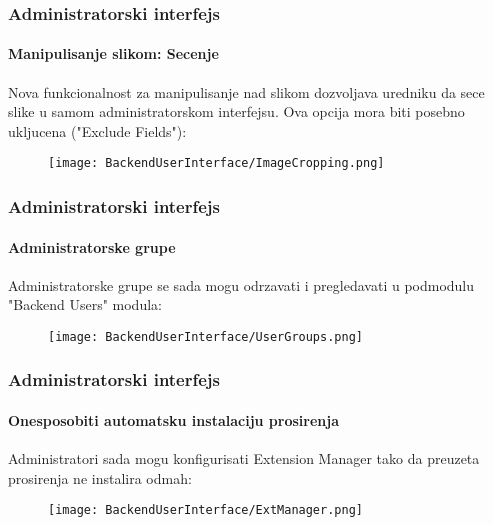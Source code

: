 \begin{frame}[fragile]
	\frametitle{Administratorski interfejs}
	\framesubtitle{Manipulisanje slikom: Secenje}

	Nova funkcionalnost za manipulisanje nad slikom dozvoljava uredniku da sece slike u samom administratorskom interfejsu.
	Ova opcija mora biti posebno ukljucena ("Exclude Fields"):

	\begin{figure}
		\texttt{[image: BackendUserInterface/ImageCropping.png]}
	\end{figure}

\end{frame}

\begin{frame}[fragile]
	\frametitle{Administratorski interfejs}
	\framesubtitle{Administratorske grupe}

	Administratorske grupe se sada mogu odrzavati i pregledavati u podmodulu "Backend Users" modula:

	\begin{figure}
		\texttt{[image: BackendUserInterface/UserGroups.png]}
	\end{figure}

\end{frame}

\begin{frame}[fragile]
	\frametitle{Administratorski interfejs}
	\framesubtitle{Onesposobiti automatsku instalaciju prosirenja}

	Administratori sada mogu konfigurisati Extension Manager tako da preuzeta prosirenja ne instalira odmah:

	\begin{figure}
		\texttt{[image: BackendUserInterface/ExtManager.png]}
	\end{figure}

\end{frame}

